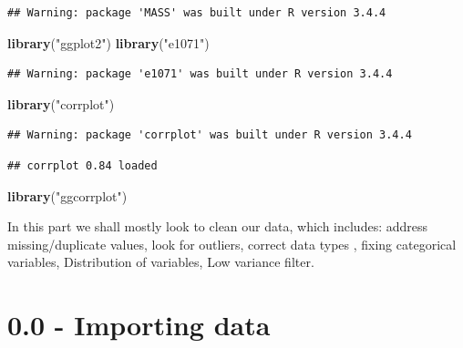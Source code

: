 \documentclass[]{article}
\newenvironment{Shaded}{\begin{snugshade}}{\end{snugshade}}
\newcommand{\KeywordTok}[1]{\textcolor[rgb]{0.13,0.29,0.53}{\textbf{#1}}}
\newcommand{\StringTok}[1]{\textcolor[rgb]{0.31,0.60,0.02}{#1}}
\newcommand{\NormalTok}[1]{#1}
\begin{document}
\begin{verbatim}
## Warning: package 'MASS' was built under R version 3.4.4
\end{verbatim}

\begin{Shaded}
\begin{Highlighting}[]
\KeywordTok{library}\NormalTok{(}\StringTok{"ggplot2"}\NormalTok{)}
\KeywordTok{library}\NormalTok{(}\StringTok{"e1071"}\NormalTok{)}
\end{Highlighting}
\end{Shaded}

\begin{verbatim}
## Warning: package 'e1071' was built under R version 3.4.4
\end{verbatim}

\begin{Shaded}
\begin{Highlighting}[]
\KeywordTok{library}\NormalTok{(}\StringTok{"corrplot"}\NormalTok{)}
\end{Highlighting}
\end{Shaded}

\begin{verbatim}
## Warning: package 'corrplot' was built under R version 3.4.4
\end{verbatim}

\begin{verbatim}
## corrplot 0.84 loaded
\end{verbatim}

\begin{Shaded}
\begin{Highlighting}[]
\KeywordTok{library}\NormalTok{(}\StringTok{"ggcorrplot"}\NormalTok{)}
\end{Highlighting}
\end{Shaded}

In this part we shall mostly look to clean our data, which includes:
address missing/duplicate values, look for outliers, correct data types
, fixing categorical variables, Distribution of variables, Low variance
filter.

\section{0.0 - Importing data}\label{importing-data}
\end{document}
